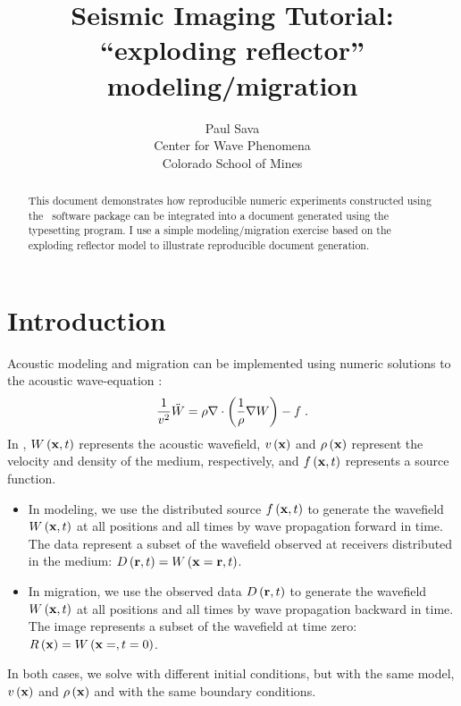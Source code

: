 

\author{Paul Sava \\ Center for Wave Phenomena \\ Colorado School of Mines}
\title{Seismic Imaging Tutorial: \\
  ``exploding reflector'' modeling/migration}
\maketitle

\begin{abstract}
This document demonstrates how reproducible numeric experiments
constructed using the \mg~software package can be integrated into a
document generated using the \latex typesetting program. I use a
simple modeling/migration exercise based on the exploding reflector
model to illustrate reproducible document generation.
\end{abstract}

\section{Introduction}

Acoustic modeling and migration can be implemented using numeric
solutions to the acoustic wave-equation \cite[]{Claerbout.iei.1985}:
%
\begin{equation} \label{eqn:AWE}
  \frac{1}{v^2} \ddot{W} = 
  \rho \nabla \cdot {\left (\frac{1}{\rho} \nabla {W} \right)} -f \;.
\end{equation}
%
In , $W\left ( {\bf x}, t \right)$ represents the acoustic wavefield, $v\left ( {\bf x} \right)$
and $\rho\left ( {\bf x} \right)$ represent the velocity and density of the medium,
respectively, and $f\left ( {\bf x}, t \right)$ represents a source function.
\begin{itemize}
\item In modeling, we use the distributed source $f\left ( {\bf x}, t \right)$ to generate
  the wavefield $W\left ( {\bf x}, t \right)$ at all positions and all times by wave
  propagation forward in time. The data represent a subset of the
  wavefield observed at receivers distributed in the medium: $D\left (
  {\bf r},t \right)=W\left ( {\bf x}={\bf r},t \right)$.
\item In migration, we use the observed data $D\left ( {\bf r},t \right)$ to
  generate the wavefield $W\left ( {\bf x}, t \right)$ at all positions and all times by
  wave propagation backward in time. The image represents a subset of
  the wavefield at time zero: $R\left ( {\bf x} \right)=W\left ( {\bf x}=,t=0 \right)$.
\end{itemize}
In both cases, we solve  with different initial conditions,
but with the same model, $v\left ( {\bf x} \right)$ and $\rho\left ( {\bf x} \right)$ and with the same
boundary conditions.

